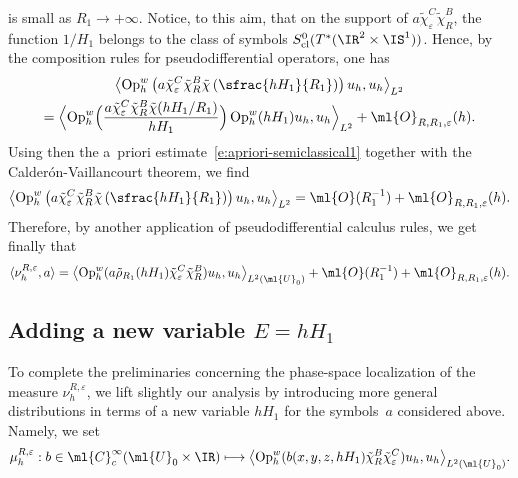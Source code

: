\documentclass[10pt]{amsart}
\newcommand\mto{\mathchoice{\longmapsto}{\mapsto}{\mapsto}{\mapsto}}
\theoremstyle{plain}
\theoremstyle{definition}
\theoremstyle{remark}
\newcommand{\Op}{\operatorname{Op}}
\begin{document}
is small as $R_1\to +\infty$. Notice, to this aim, that on the support of $a\tilde{\chi}_\varepsilon^C\tilde{\chi}_R^B$, the function $1/H_1$ belongs to the class of symbols $S^0_{\textup{cl}}(T^*(\IR^2\times\IS^1))$. Hence, by the composition rules for pseudodifferential operators, one has
\begin{multline*}
\left\langle \Op_h^w\left(a\tilde{\chi}_\varepsilon^C\tilde{\chi}_R^B\tilde{\chi}\left(\sfrac{hH_1}{R_1}\right)\right)u_h,u_h\right\rangle_{L^2}\\
=\Bigl\langle \Op_h^w\Bigl(\frac{a\tilde{\chi}_\varepsilon^C\tilde{\chi}_R^B\tilde{\chi}(hH_1/R_1)}{hH_1}\Bigr)\Op_h^w(hH_1)u_h,u_h\Bigr\rangle_{L^2}+\ml{O}_{R,R_1,\varepsilon}(h).
\end{multline*}
Using then the a~priori estimate~\eqref{e:apriori-semiclassical1} together with the Calderón-Vaillancourt theorem, we find
\[
\left\langle\Op_h^w\left(a\tilde{\chi}_\varepsilon^C\tilde{\chi}_R^B\tilde{\chi}\left(\sfrac{hH_1}{R_1}\right)\right)u_h,u_h\right\rangle_{L^2}
=\ml{O}(R_1^{-1})+\ml{O}_{R,R_1,\varepsilon}(h).
\]
Therefore, by another application of pseudodifferential calculus rules, we get finally that
\begin{equation}\label{e:measure-pseudo4}
\langle\nu_h^{R,\varepsilon},a\rangle=\left\langle \Op_h^w(a\tilde{\rho}_{R_1}(hH_1)\tilde{\chi}_\varepsilon^C\tilde{\chi}_R^B)u_h,u_h\right\rangle_{L^2(\ml{U}_0)}+\ml{O}(R_1^{-1})+\ml{O}_{R,R_1,\varepsilon}(h).
\end{equation}

\subsection{Adding a new variable $E=hH_1$}\label{s:new_variable}
To complete the preliminaries concerning the phase-space localization of the measure $\nu_h^{R,\varepsilon}$, we lift slightly our analysis by intro\-ducing more general distributions in terms of a new variable $h H_1$ for the symbols~$a$ considered above. Namely, we set
\begin{equation}\label{e:wigner-H1}\mu_{h}^{R,\varepsilon}: b\in\ml{C}_c^{\infty}(\ml{U}_0\times\IR)\mto\bigl\langle \Op_h^w(b(x,y,z,hH_1)\tilde{\chi}_R^B\tilde{\chi}_\varepsilon^C)u_h,u_h\bigr\rangle_{L^2(\ml{U}_0)}.\end{equation}
\end{document}
